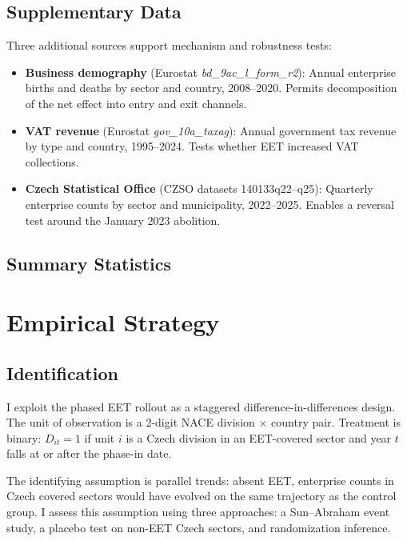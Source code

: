 \documentclass[12pt]{article}
\begin{document}
\subsection{Supplementary Data}

Three additional sources support mechanism and robustness tests:

\begin{itemize}[nosep]
  \item \textbf{Business demography} (Eurostat \textit{bd\_9ac\_l\_form\_r2}): Annual enterprise births and deaths by sector and country, 2008--2020. Permits decomposition of the net effect into entry and exit channels.
  \item \textbf{VAT revenue} (Eurostat \textit{gov\_10a\_taxag}): Annual government tax revenue by type and country, 1995--2024. Tests whether EET increased VAT collections.
  \item \textbf{Czech Statistical Office} (CZSO datasets 140133q22--q25): Quarterly enterprise counts by sector and municipality, 2022--2025. Enables a reversal test around the January 2023 abolition.
\end{itemize}

\subsection{Summary Statistics}




\section{Empirical Strategy}

\subsection{Identification}

I exploit the phased EET rollout as a staggered difference-in-differences design. The unit of observation is a 2-digit NACE division $\times$ country pair. Treatment is binary: $D_{it} = 1$ if unit $i$ is a Czech division in an EET-covered sector and year $t$ falls at or after the phase-in date.

The identifying assumption is parallel trends: absent EET, enterprise counts in Czech covered sectors would have evolved on the same trajectory as the control group. I assess this assumption using three approaches: a Sun--Abraham event study, a placebo test on non-EET Czech sectors, and randomization inference.
\end{document}
